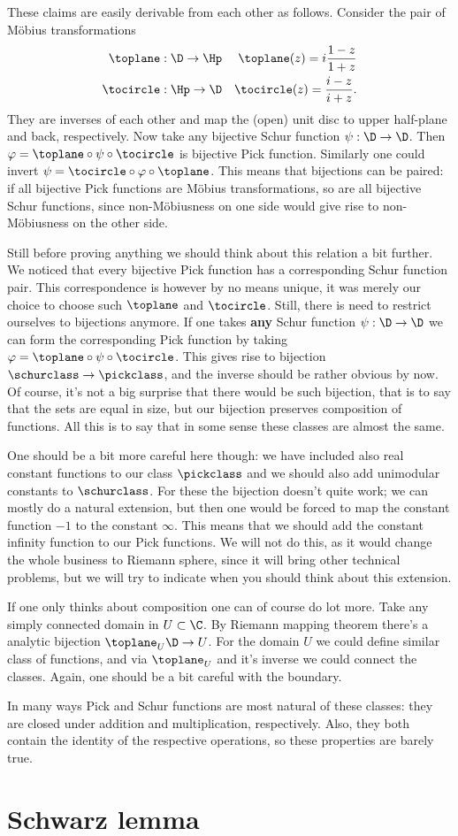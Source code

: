 These claims are easily derivable from each other as follows. Consider the pair of Möbius transformations
\begin{eqnarray*}
	\toplane : \D \to \Hp & & \toplane (z) = i \frac{1 - z}{1 + z} \\
	\tocircle : \Hp \to \D & & \tocircle (z) = \frac{i - z}{i + z}.
\end{eqnarray*}
They are inverses of each other and map the (open) unit disc to upper half-plane and back, respectively. Now take any bijective Schur function $\psi : \D \to \D$. Then $\varphi = \toplane \circ \psi \circ \tocircle$ is bijective Pick function. Similarly one could invert $\psi = \tocircle \circ \varphi \circ \toplane$. This means that bijections can be paired: if all bijective Pick functions are Möbius transformations, so are all bijective Schur functions, since non-Möbiusness on one side would give rise to non-Möbiusness on the other side.

Still before proving anything we should think about this relation a bit further. We noticed that every bijective Pick function has a corresponding Schur function pair. This correspondence is however by no means unique, it was merely our choice to choose such $\toplane$ and $\tocircle$. Still, there is need to restrict ourselves to bijections anymore. If one takes \textbf{any} Schur function $\psi : \D \to \D$ we can form the corresponding Pick function by taking $\varphi = \toplane \circ \psi \circ \tocircle$. This gives rise to bijection $\schurclass \to \pickclass$, and the inverse should be rather obvious by now. Of course, it's not a big surprise that there would be such bijection, that is to say that the sets are equal in size, but our bijection preserves composition of functions. All this is to say that in some sense these classes are almost the same.

One should be a bit more careful here though: we have included also real constant functions to our class $\pickclass$ and we should also add unimodular constants to $\schurclass$. For these the bijection doesn't quite work; we can mostly do a natural extension, but then one would be forced to map the constant function $-1$ to the constant $\infty$. This means that we should add the constant infinity function to our Pick functions. We will not do this, as it would change the whole business to Riemann sphere, since it will bring other technical problems, but we will try to indicate when you should think about this extension.

If one only thinks about composition one can of course do lot more. Take any simply connected domain in $U \subset \C$. By Riemann mapping theorem there's a analytic bijection $\toplane_{U} \D \to U$. For the domain $U$ we could define similar class of functions, and via $\toplane_{U}$ and it's inverse we could connect the classes. Again, one should be a bit careful with the boundary.

In many ways Pick and Schur functions are most natural of these classes: they are closed under addition and multiplication, respectively. Also, they both contain the identity of the respective operations, so these properties are barely true. 

\section{Schwarz lemma}